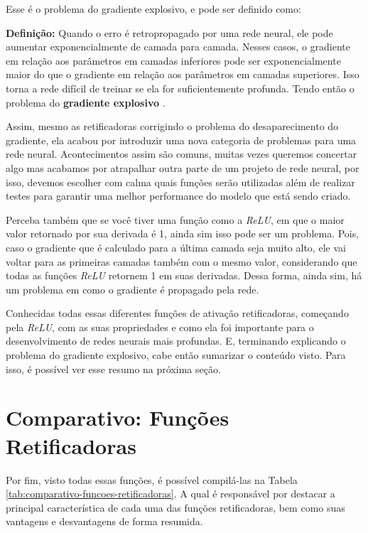 Esse é o problema do gradiente explosivo, e pode ser definido como:

\begin{definicaomoderna}{\textbf{Definição:}}
    Quando o erro é retropropagado por uma rede neural, ele pode aumentar exponencialmente de camada para camada. Nesses casos, o gradiente em relação aos parâmetros em camadas inferiores pode ser exponencialmente maior do que o gradiente em relação aos parâmetros em camadas superiores. Isso torna a rede difícil de treinar se ela for suficientemente profunda. Tendo então o problema do \textbf{gradiente explosivo} \parencite{ExplodingGradient}.
\end{definicaomoderna}

Assim, mesmo as retificadoras corrigindo o problema do desaparecimento do gradiente, ela acabou por introduzir uma nova categoria de problemas para uma rede neural. Acontecimentos assim são comuns, muitas vezes queremos concertar algo mas acabamos por atrapalhar outra parte de um projeto de rede neural, por isso, devemos escolher com calma quais funções serão utilizadas além de realizar testes para garantir uma melhor performance do modelo que está sendo criado.

Perceba também que se você tiver uma função como a \textit{ReLU}, em que o maior valor retornado por sua derivada é 1, ainda sim isso pode ser um problema. Pois, caso o gradiente que é calculado para a última camada seja muito alto, ele vai voltar para as primeiras camadas também com o mesmo valor, considerando que todas as funções \textit{ReLU} retornem 1 em suas derivadas. Dessa forma, ainda sim, há um problema em como o gradiente é propagado pela rede.

Conhecidas todas essas diferentes funções de ativação retificadoras, começando pela \textit{ReLU}, com as suas propriedades e como ela foi importante para o desenvolvimento de redes neurais mais profundas. E, terminando explicando o problema do gradiente explosivo, cabe então sumarizar o conteúdo visto. Para isso, é possível ver esse resumo na próxima seção.

\section{Comparativo: Funções Retificadoras} 

Por fim, visto todas essas funções, é possível compilá-las na Tabela \ref{tab:comparativo-funcoes-retificadoras}. A qual é responsável por destacar a principal característica de cada uma das funções retificadoras, bem como suas vantagens e desvantagens de forma resumida.

